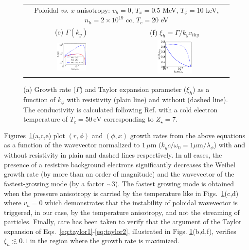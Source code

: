 \documentclass[aps,showpacs,superscriptaddress]{revtex4}
\begin{document}
\begin{figure}[ht]
{\begin{tabular}{cc}
\multicolumn{2}{c}{Poloidal \emph{vs.} $x$  anisotropy: $v_h = 0 $, $T_x=0.5$ MeV, $T_\phi = 10$ keV, $n_h = 2\times 10^{19}$ cc, $T_{c}=20$ eV }\\
(e) $\Gamma(k_y)$&(f) $\xi_h= \Gamma/k_yv_{thy}$ \\
\includegraphics[width=0.33\textwidth]{gamma_ky_ordre3_r_phi_2.eps} 
 &\includegraphics[width=0.33\textwidth]{xi_ky_ordre3_r_phi_2.eps} 
\end{tabular}} 
\caption{\label{fig:gamma_ky} 
(a) Growth rate ($\Gamma$) and Taylor expansion parameter ($\xi_h$) as a function of $k_\phi$ with resistivity (plain line) and without (dashed line).
The conductivity is calculated following Ref.  \cite[]{POP_Perez_2012} with a cold electron temperature of $T_c = 50\,\mathrm{eV}$ corresponding to $Z_\star = 7$. 
}
\end{figure}

Figures~\ref{fig:gamma_ky}(a,c,e) plot $(r, \phi)$ and $(\phi,x)$ growth rates from the above equations as a function of the wavevector normalized to $1\, \mu$m ($k_yc/\omega_0 = 1\mu\mathrm{m}/\lambda_\phi$) with and without resistivity in plain and dashed lines respectively. 
In all cases, the presence of a resistive background electrons significantly decreases the Weibel growth rate (by more than an order of magnitude) and the wavevector of the fastest-growing mode (by a factor $\sim 3$). 
The fastest growing mode is obtained when the pressure anisotropy is carried by the temperature like in Figs.~\ref{fig:gamma_ky}(c,d)  where $v_h = 0$ which demonstrates that the instability of poloidal wavevector is triggered, in our case, by the temperature anisotropy, and not the streaming of particles.
Finally, care has been taken to verify that the argument of the Taylor expansion of Eqs.~\eqref{eq:taylor1}-\eqref{eq:taylor2}, illustrated in Figs. \ref{fig:gamma_ky}(b,d,f),
verifies $\xi_h \lesssim 0.1$ in the region where the growth rate is maximized.
\end{document}
